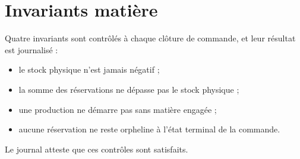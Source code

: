 \section{Invariants matière}

Quatre invariants sont contrôlés à chaque clôture de commande, et leur résultat est journalisé :
\begin{itemize}
  \item le stock physique n'est jamais négatif ;
  \item la somme des réservations ne dépasse pas le stock physique ;
  \item une production ne démarre pas sans matière engagée ;
  \item aucune réservation ne reste orpheline à l'état terminal de la commande.
\end{itemize}
Le journal  atteste que ces contrôles sont satisfaits.

